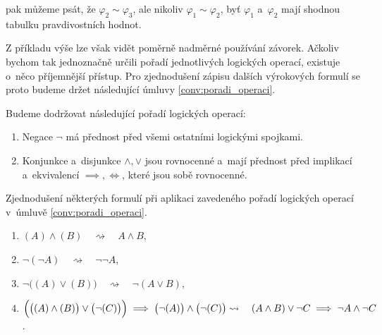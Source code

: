 pak můžeme psát, že $\varphi_2\sim\varphi_3$, ale nikoliv $\varphi_1\sim\varphi_2$, byť $\varphi_1$ a~$\varphi_2$ mají shodnou tabulku pravdivostních hodnot.\par
Z příkladu výše lze však vidět poměrně nadměrné používání závorek. Ačkoliv bychom tak jednoznačně určili pořadí jednotlivých logických operací, existuje o~něco příjemnější přístup. Pro zjednodušení zápisu dalších výrokových formulí se proto budeme držet následující úmluvy \ref{conv:poradi_operaci}.
\begin{convention}\label{conv:poradi_operaci}
    Budeme dodržovat následující pořadí logických operací:
    \begin{enumerate}[label=(\arabic*)]
        \item Negace $\neg$ má přednost před všemi ostatními logickými spojkami.
        \item Konjunkce a~disjunkce $\land,\lor$ jsou rovnocenné a~mají přednost před implikací a~ekvivalencí $\implies,\iff$, které jsou sobě rovnocenné.
    \end{enumerate}
\end{convention}
\begin{example}
    Zjednodušení některých formulí při aplikaci zavedeného pořadí logických operací v~úmluvě \ref{conv:poradi_operaci}.
    \begin{enumerate}[label=(\roman*)]
        \item $(A) \land (B)\quad\rightsquigarrow\quad A \land B$,
        \item $\neg(\neg A)\quad\rightsquigarrow\quad \neg\neg A$,
        \item $\neg \bigl((A) \lor (B)\bigr)\quad \rightsquigarrow\quad \neg(A \lor B)$,
        \item $\Bigl(\bigl((A) \land (B)\bigr) \lor \bigl(\neg (C)\bigr)\Bigr) \implies \bigl(\neg (A)\bigr) \land \bigl(\neg (C)\bigr)\\ \rightsquigarrow\quad(A \land B) \lor \neg C \implies \neg A \land \neg C$.
    \end{enumerate}
\end{example}

